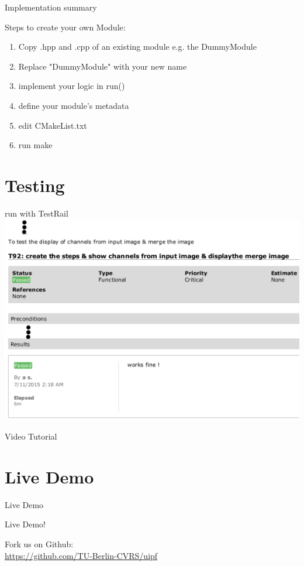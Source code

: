 \documentclass{beamer}
\begin{document}
\begin{frame}[fragile]{Implementation summary}

Steps to create your own Module:
	\begin{enumerate}
		\item Copy .hpp and .cpp of an existing module e.g. the DummyModule \pause
		\item Replace "DummyModule" with your new name \pause
		\item implement your logic in run()  \pause
		\item define your module's metadata \pause
		\item edit CMakeList.txt \pause
		\item run make
	\end{enumerate}


	\pnote{
	}

\end{frame}



\section{Testing}
\begin{frame}{run with TestRail}
	\includegraphics[width=\textwidth]{images/eval}
\end{frame}

\begin{frame}{Video Tutorial}
\end{frame}



\section{Live Demo}

\begin{frame}{Live Demo}

\begin{center}
	{\Huge
	Live Demo!}
	\vspace{2cm}

	Fork us on Github:\\\vspace{0.2cm}
	\url{https://github.com/TU-Berlin-CVRS/uipf}

\end{center}
\end{frame}
\end{document}
